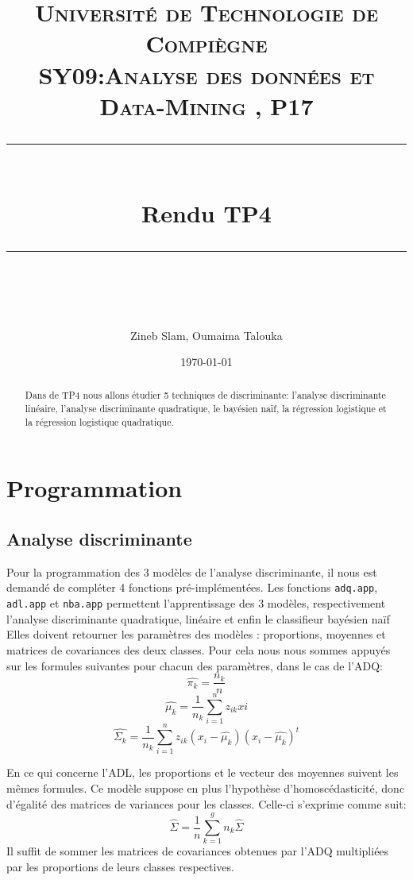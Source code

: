\documentclass[10pt]{article}
\title{
	\normalfont \normalsize 
	\textsc{Université de Technologie de Compiègne\\ 
		SY09:Analyse des données et Data-Mining , P17} \\
	[10pt]
	\rule{\linewidth}{0.5pt} \\[6pt] 
	\huge Rendu TP4\\
	\rule{\linewidth}{2pt}  \\[10pt]
}
\author{Zineb Slam, Oumaima Talouka}
\date{\normalsize \today}
\begin{document}
	{\let\newpage\relax\maketitle}	
	
		\begin{abstract}
			Dans de TP4 nous allons étudier 5 techniques de discriminante: l'analyse discriminante linéaire, l'analyse discriminante quadratique, le bayésien naïf, la régression logistique et la régression logistique quadratique. 
		\end{abstract}
	

\section{Programmation}
	\subsection{Analyse discriminante}
	Pour la programmation des 3 modèles de l'analyse discriminante, il nous est demandé de compléter 4 fonctions pré-implémentées.
	Les fonctions \texttt{adq.app}, \texttt{adl.app} et \texttt{nba.app} permettent l'apprentissage des 3 modèles, respectivement l'analyse discriminante quadratique, linéaire et enfin le classifieur bayésien naïf Elles doivent retourner les paramètres des modèles : proportions, moyennes et matrices de covariances des deux classes. Pour cela nous nous sommes appuyés sur les formules suivantes pour chacun des paramètres, dans le cas de l'ADQ: 
	\begin{equation*}
	\widehat{\pi_{k}} = \dfrac{n_{k}}{n}
	\end{equation*}	
	\begin{equation*}
	\widehat{\mu_{k}} = \dfrac{1}{n_{k}}\sum_{i=1}^{n} z_{ik}x{i}
	\end{equation*}
	\begin{equation*}
	\widehat{\Sigma_{k}} = \dfrac{1}{n_{k}}\sum_{i=1}^{n} z_{ik} (x_{i}-\widehat{\mu_{k}})(x_{i}-\widehat{\mu_{k}})^{t}
	\end{equation*} 
	
	En ce qui concerne l'ADL, les proportions et le vecteur des moyennes suivent les mêmes formules. Ce modèle suppose en plus l'hypothèse d'homoscédasticité, donc d'égalité des matrices de variances pour les classes. Celle-ci s'exprime comme suit: 
	\begin{equation*}
	\widehat{\Sigma} = \dfrac{1}{n}\sum_{k=1}^{g} n_{k} \widehat{\Sigma}
	\end{equation*}	
	Il suffit de sommer les matrices de covariances obtenues par l'ADQ multipliées par les proportions de leurs classes respectives.
	
\end{document}
